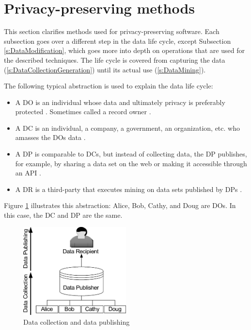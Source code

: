 \section{Privacy-preserving methods}
\label{s:types of methods}

This section clarifies methods used for privacy-preserving software.
Each subsection goes over a different step in the data life cycle, except Subsection \ref{s:DataModification}, which goes more into depth on operations that are used for the described techniques.
The life cycle is covered from capturing the data (\ref{s:DataCollectionGeneration}) until its actual use (\ref{s:DataMining}).

The following typical abstraction is used to explain the data life cycle:

\begin{itemize}

    \item 
        A \gls{DO} is an individual whose data and ultimately privacy is preferably protected 
        \cite{Aldeen2015,Jain2016,Kundeti2018}.
        Sometimes called a record owner \cite{Fung2010}.

    \item
        A \gls{DC} is an individual, a company, a government, an organization, etc. who amasses the \gls{DO}s data 
        \cite{Fung2010}.

    \item
        A \gls{DP} is comparable to \gls{DC}s, but instead of collecting data, the \gls{DP} publishes,
        for example, by sharing a data set on the web or making it accessible through an API 
        \cite{Aldeen2015,Fung2010}.

    \item
        A \gls{DR} is a third-party that executes mining on data sets published by \gls{DP}s \cite{Fung2010, Sweeney2002, Barbosa2020}.
    
\end{itemize}

Figure \ref{fig:DataCollectionDataPublishing} illustrates this abstraction: Alice, Bob, Cathy, and Doug are \gls{DO}s.
In this case, the \gls{DC} and \gls{DP} are the same.
\begin{figure}[h!]
\centering
    \includegraphics[width=0.5\textwidth]{figures/data-collection-and-data-publishing.png}
\caption{Data collection and data publishing \cite{Fung2010}}
\label{fig:DataCollectionDataPublishing}
\end{figure}

